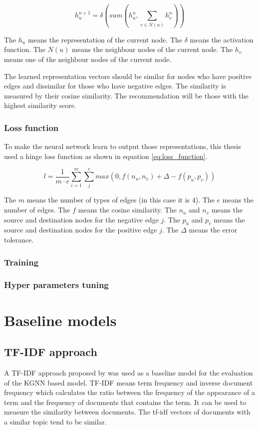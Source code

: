 \documentclass[11pt,twoside]{report}
\begin{document}
\begin{equation}
    h_u^{n+1}=\delta(sum(h_u^n, \sum_{v\in{N(u)}}h_v^n))
    \label{eq:message_passing_aggregation}
\end{equation}

The $h_u$ means the representation of the current node. The $\delta$ means the activation function. The $N(u)$ means the neighbour nodes of the current node. The $h_v$ means one of the neighbour nodes of the current node.

The learned representation vectors should be similar for nodes who have positive edges and dissimilar for those who have negative edges. The similarity is measured by their cosine similarity. The recommendation will be those with the highest similarity score.

\subsection{Loss function}
To make the neural network learn to output those representations, this thesis used a hinge loss function as shown in equation \ref{eq:loss_function}.

\begin{equation}
    l=\frac{1}{m\cdot{e}}\sum_{i=1}^{m}\sum_{j}^{e} max(0, f(n_u, n_v)+\Delta-f(p_u, p_v))
    \label{eq:loss_function}
\end{equation}

The $m$ means the number of types of edges (in this case it is 4). The $e$ means the number of edges. The $f$ means the cosine similarity. The $n_u$ and $n_v$ means the source and destination nodes for the negative edge $j$. The $p_u$ and $p_v$ means the source and destination nodes for the positive edge $j$. The $\Delta$ means the error tolerance.

\subsection{Training}

\subsection{Hyper parameters tuning}

\chapter{Baseline models}
\section{TF-IDF approach}
A TF-IDF approach proposed by \cite{sun_personalized_2018} was used as a baseline model for the evaluation of the KGNN based model. TF-IDF means term frequency and inverse document frequency which calculates the ratio between the frequency of the appearance of a term and the frequency of documents that contains the term. It can be used to measure the similarity between documents. The tf-idf vectors of documents with a similar topic tend to be similar.
\end{document}

